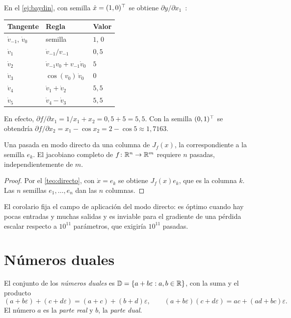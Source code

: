 \begin{ejemplo}\label{ej:tangente}
En el \cref{ej:baydin}, con semilla $\dot x=(1,0)^{\top}$ se obtiene $\partial y/\partial x_1$~\cite[tabla~2]{baydin}:
\begin{center}\small
\begin{tabular}{@{}lll@{}}
\toprule
Tangente & Regla & Valor \\
\midrule
$\dot v_{-1}$, $\dot v_0$ & semilla & $1$, $0$ \\
$\dot v_1$ & $\dot v_{-1}/v_{-1}$ & $0{,}5$ \\
$\dot v_2$ & $\dot v_{-1}v_0+v_{-1}\dot v_0$ & $5$ \\
$\dot v_3$ & $\cos(v_0)\,\dot v_0$ & $0$ \\
$\dot v_4$ & $\dot v_1+\dot v_2$ & $5{,}5$ \\
$\dot v_5$ & $\dot v_4-\dot v_3$ & $5{,}5$ \\
\bottomrule
\end{tabular}
\end{center}
En efecto, $\partial f/\partial x_1=1/x_1+x_2=0{,}5+5=5{,}5$. Con la semilla $(0,1)^{\top}$ se obtendría $\partial f/\partial x_2=x_1-\cos x_2=2-\cos 5\approx 1{,}7163$.
\end{ejemplo}

\begin{corolario}\label{cor:coste-directo}
Una pasada en modo directo da una columna de $J_f(x)$, la correspondiente a la semilla $e_k$. El jacobiano completo de $f\colon\mathbb{R}^{n}\to\mathbb{R}^{m}$ requiere $n$ pasadas, independientemente de $m$.
\end{corolario}

\begin{proof}
Por el \cref{teo:directo}, con $\dot x=e_k$ se obtiene $J_f(x)e_k$, que es la columna $k$. Las $n$ semillas $e_1,\dots,e_n$ dan las $n$ columnas.
\end{proof}

El corolario fija el campo de aplicación del modo directo: es óptimo cuando hay pocas entradas y muchas salidas y es inviable para el gradiente de una pérdida escalar respecto a $10^{11}$ parámetros, que exigiría $10^{11}$ pasadas.

\section{Números duales}

\begin{definicion}\label{def:duales}
El conjunto de los \emph{números duales} es $\mathbb{D}=\{a+b\varepsilon : a,b\in\mathbb{R}\}$, con la suma y el producto
\[
(a+b\varepsilon)+(c+d\varepsilon)=(a+c)+(b+d)\varepsilon,\qquad
(a+b\varepsilon)(c+d\varepsilon)=ac+(ad+bc)\varepsilon .
\]
El número $a$ es la \emph{parte real} y $b$, la \emph{parte dual}.
\end{definicion}

